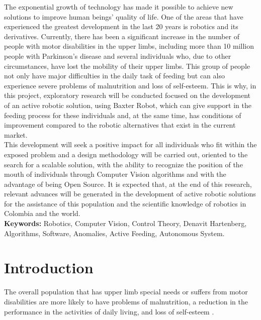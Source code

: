 \documentclass[11pt]{report} %
\begin{document}
The exponential growth of technology has made it possible to achieve new solutions to improve human beings' quality of life. One of the areas that have experienced the greatest development in the last 20 years is robotics and its derivatives. Currently, there has been a significant increase in the number of people with motor disabilities in the upper limbs, including more than 10 million people with Parkinson's disease and several individuals who, due to other circumstances, have lost the mobility of their upper limbs. This group of people not only have major difficulties in the daily task of feeding but can also experience severe problems of malnutrition and loss of self-esteem. This is why, in this project, exploratory research will be conducted focused on the development of an active robotic solution, using Baxter Robot, which can give support in the feeding process for these individuals and, at the same time, has conditions of improvement compared to the robotic alternatives that exist in the current market.\\

This development will seek a positive impact for all individuals who fit within the exposed problem and a design methodology will be carried out, oriented to the search for a scalable solution, with the ability to recognize the position of the mouth of individuals through Computer Vision algorithms and with the advantage of being Open Source. It is expected that, at the end of this research, relevant advances will be generated in the development of active robotic solutions for the assistance of this population and the scientific knowledge of robotics in Colombia and the world.\\


\textbf{Keywords:} Robotics, Computer Vision, Control Theory, Denavit Hartenberg, Algorithms, Software, Anomalies, Active Feeding, Autonomous System.


\chapter*{Introduction}

The overall population that has upper limb special needs or suffers from motor disabilities are more likely to have problems of malnutrition, a reduction in the performance in the activities of daily living, and loss of self-esteem  \citep{cite_ICBF_technical_article, cite_upper_limb_disabilities_self_steem}.\\
\end{document}
